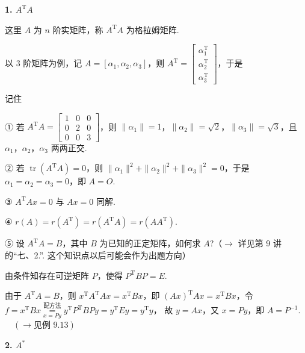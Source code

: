 

\textbf{1. $A^{\mathrm T}A$}

这里 $A$ 为 $n$ 阶实矩阵，称 $A^{\mathrm T}A$ 为格拉姆矩阵.

以 3 阶矩阵为例，记 $A=[\alpha_1,\alpha_2,\alpha_3]$，则 $A^{\mathrm T}=\begin{bmatrix}\alpha_1^{\mathrm T}\\\alpha_2^{\mathrm T}\\\alpha_3^{\mathrm T}\end{bmatrix}$，于是
\begin{fkey}{记住}
\end{fkey}

① 若 $A^{\mathrm T}A=\begin{bmatrix}1&0&0\\0&2&0\\0&0&3\end{bmatrix}$，则 $\|\alpha_1\|=1$，$\|\alpha_2\|=\sqrt2$，$\|\alpha_3\|=\sqrt3$，且 $\alpha_1$，$\alpha_2$，$\alpha_3$ 两两正交.

② 若 $\operatorname{tr}(A^{\mathrm T}A)=0$，则 $\|\alpha_1\|^2+\|\alpha_2\|^2+\|\alpha_3\|^2=0$，于是 $\alpha_1=\alpha_2=\alpha_3=0$，即 $A=O$.

③ $A^{\mathrm T}Ax=0$ 与 $Ax=0$ 同解.

④ $r(A)=r(A^{\mathrm T})=r(A^{\mathrm T}A)=r(AA^{\mathrm T})$.

⑤ 设 $A^{\mathrm T}A=B$，其中 $B$ 为已知的正定矩阵，如何求 $A$?（$\to$ 详见第 9 讲的“七、2.”. 这个知识点以后可能会作为出题方向）

由条件知存在可逆矩阵 $P$，使得 $P^{\mathrm T}BP=E$.

由于 $A^{\mathrm T}A=B$，则 $x^{\mathrm T}A^{\mathrm T}Ax=x^{\mathrm T}Bx$，即 $(Ax)^{\mathrm T}Ax=x^{\mathrm T}Bx$，令 $f=x^{\mathrm T}Bx\overset{\text{配方法}}{\underset{x=Py}{=}}y^{\mathrm T}P^{\mathrm T}BPy=y^{\mathrm T}Ey=y^{\mathrm T}y$，
故 $y=Ax$，又 $x=Py$，即 $A=P^{-1}$. $\quad(\to\text{见例 9.13})$

\textbf{2. $A^*$}

